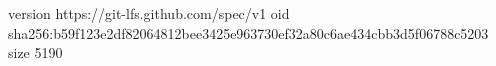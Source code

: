 version https://git-lfs.github.com/spec/v1
oid sha256:b59f123e2df82064812bee3425e963730ef32a80c6ae434cbb3d5f06788c5203
size 5190

